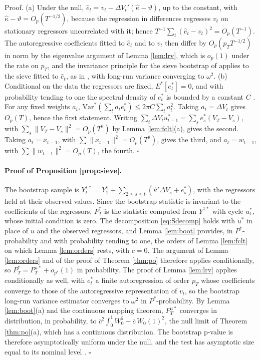 \documentclass[12pt,a4paper]{article}
\theoremstyle{definition}
\begin{document}
\noindent Proof. (a) Under the null, $\hat e_t=v_t-\Delta V_t'(\hat\kappa-\vartheta)$, up to the constant, with $\hat\kappa-\vartheta=O_p(T^{-1/2})$, because the regression in differences regresses $v_t$ on stationary regressors uncorrelated with it; hence $T^{-1}\sum_t(\hat e_t-v_t)^2=O_p(T^{-1})$. The autoregressive coefficients fitted to $\hat e_t$ and to $v_t$ then differ by $O_p(p_TT^{-1/2})$ in norm by the eigenvalue argument of Lemma \ref{lem:lrv}, which is $o_p(1)$ under the rate on $p_T$, and the invariance principle for the sieve bootstrap of \citet[Theorem 3.3]{Park2002} applies to the sieve fitted to $\hat e_t$, as in \citet{ChangPark2003}, with long-run variance converging to $\omega^2$.
(b) Conditional on the data the regressors are fixed, $E^\ast[e^\ast_t]=0$, and with probability tending to one the spectral density of $e^\ast_t$ is bounded by a constant $C$ \citep{Park2002}. For any fixed weights $a_t$, $\mathrm{Var}^\ast(\sum_ta_te^\ast_t)\leq2\pi C\sum_ta_t^2$. Taking $a_t=\Delta V_t$ gives $O_p(T)$, hence the first statement. Writing $\sum_t\Delta V_tu^\ast_{t-1}=\sum_se^\ast_s(V_T-V_s)$, with $\sum_s\|V_T-V_s\|^2=O_p(T^2)$ by Lemma \ref{lem:fclt}(a), gives the second. Taking $a_t=x_{t-1}$, with $\sum\|x_{t-1}\|^2=O_p(T^2)$, gives the third, and $a_t=w_{t-1}$, with $\sum\|w_{t-1}\|^2=O_p(T)$, the fourth. $\square$

\paragraph{Proof of Proposition \ref{prop:sieve}.} The bootstrap sample is $Y^{1\ast}_t=Y^1_1+\sum_{2\leq s\leq t}(\hat\kappa'\Delta V_s+e^\ast_s)$, with the regressors held at their observed values. Since the bootstrap statistic is invariant to the coefficients of the regressors, $P^\ast_T$ is the statistic computed from $Y^{1\ast}$ with cycle $u^\ast_t$, whose initial condition is zero. The decomposition \eqref{eq:Sdecomp} holds with $u^\ast$ in place of $u$ and the observed regressors, and Lemma \ref{lem:boot} provides, in $P^\ast$-probability and with probability tending to one, the orders of Lemma \ref{lem:fclt} on which Lemma \ref{lem:orders} rests, with $c=0$. The argument of Lemma \ref{lem:orders} and of the proof of Theorem \ref{thm:po} therefore applies conditionally, so $P^\ast_T=P^{u\ast}_T+o_{p^\ast}(1)$ in probability. The proof of Lemma \ref{lem:lrv} applies conditionally as well, with $e^\ast_t$ a finite autoregression of order $p_T$ whose coefficients converge to those of the autoregressive representation of $v_t$, so the bootstrap long-run variance estimator converges to $\omega^2$ in $P^\ast$-probability. By Lemma \ref{lem:boot}(a) and the continuous mapping theorem, $P^{u\ast}_T$ converges in distribution, in probability, to $\bar c^2\int_0^1W_0^2-\bar c\,W_0(1)^2$, the null limit of Theorem \ref{thm:po}(a), which has a continuous distribution. The bootstrap p-value is therefore asymptotically uniform under the null, and the test has asymptotic size equal to its nominal level \citep{Park2003}. $\square$
\end{document}
